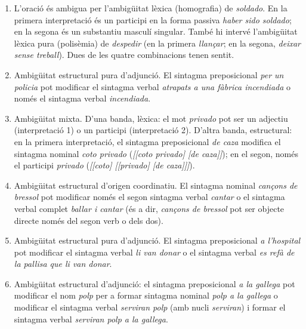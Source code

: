 \begin{enumerate}
\begin{enumerate}
  \item L'oració és ambigua per l'ambigüitat lèxica (homografia) de
    \emph{soldado}. En la primera interpretació és un participi en la
    forma passiva \emph{haber sido soldado}; en la segona és un
    substantiu masculí singular. També hi intervé l'ambigüitat lèxica
    pura (polisèmia) de \emph{despedir} (en la primera \emph{llançar};
    en la segona, \emph{deixar sense treball}). Dues de les quatre
    combinacions tenen sentit.
  \item Ambigüitat estructural pura d'adjunció. El sintagma
    preposicional \emph{per un policia} pot modificar el sintagma
    verbal \emph{atrapats a una fàbrica incendiada} o només el
    sintagma verbal \emph{incendiada}.
  \item Ambigüitat mixta. D'una banda, lèxica: el mot \emph{privado}
    pot ser un adjectiu (interpretació 1) o un participi
    (interpretació 2). D'altra banda, estructural: en la primera
    interpretació, el sintagma preposicional \emph{de caza} modifica
    el sintagma nominal \emph{coto privado} (\emph{[[coto privado] [de
      caza]]}); en el segon, només el participi \emph{privado}
    (\emph{[[coto] [[privado] [de caza]]]}).
  \item Ambigüitat estructural d'origen coordinatiu. El sintagma
    nominal \emph{cançons de bressol} pot modificar només el segon
    sintagma verbal \emph{cantar} o el sintagma verbal complet
    \emph{ballar i cantar} (és a dir, \emph{cançons de bressol} pot
    ser objecte directe només del segon verb o dels dos).
      \item Ambigüitat estructural pura d'adjunció. El sintagma
      preposicional \emph{a l'hospital} pot modificar el sintagma
      verbal \emph{li van donar}  o el sintagma verbal \emph{es refà de
      la pallisa que li van donar}.
  \item Ambigüitat estructural d'adjunció: el sintagma preposicional
    \emph{a la gallega} pot modificar el nom \emph{polp} per a formar
    sintagma nominal \emph{polp a la gallega} o modificar el sintagma
    verbal \emph{serviran polp} (amb nucli \emph{serviran}) i formar
    el sintagma verbal \emph{serviran polp a la gallega}.

\end{enumerate}
\end{enumerate}
